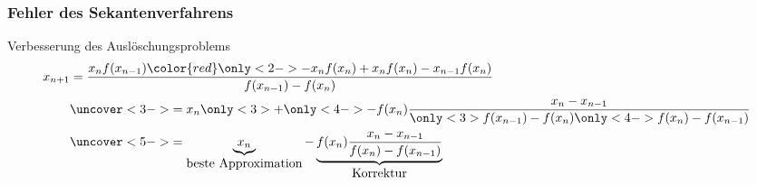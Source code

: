 %
%
%
\begin{frame}
\frametitle{Fehler des Sekantenverfahrens}
\begin{block}{Verbesserung des Auslöschungsproblems}
\begin{align*}
x_{n+1}
&=
\frac{x_nf(x_{n-1}) {\color{red}\mathstrut\only<2->{-x_nf(x_n)+x_nf(x_n)}}- x_{n-1} f(x_n)}{f(x_{n-1})-f(x_n)}
\\
&\uncover<3->{=
x_n \only<3>{+}\only<4->{-} f(x_n) \frac{x_n-x_{n-1}}{
\only<3>{f(x_{n-1})-f(x_n)}
\only<4->{f(x_{n})-f(x_{n-1})}
}}
\\
&\uncover<5->{=
\underbrace{x_n}_{\displaystyle\text{beste Approximation}}
-\underbrace{
f(x_n)\frac{x_n-x_{n-1}}{f(x_n)-f(x_{n-1})}
}_{\displaystyle\text{Korrektur}}}
\end{align*}
\end{block}
\end{frame}
